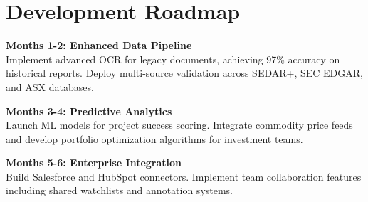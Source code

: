 \documentclass[11pt]{article}
\begin{document}
\section{Development Roadmap}

\begin{center}
\end{center}

\textbf{Months 1-2: Enhanced Data Pipeline}\\
Implement advanced OCR for legacy documents, achieving 97\% accuracy on historical reports. Deploy multi-source validation across SEDAR+, SEC EDGAR, and ASX databases.

\textbf{Months 3-4: Predictive Analytics}\\
Launch ML models for project success scoring. Integrate commodity price feeds and develop portfolio optimization algorithms for investment teams.

\textbf{Months 5-6: Enterprise Integration}\\
Build Salesforce and HubSpot connectors. Implement team collaboration features including shared watchlists and annotation systems.
\end{document}
